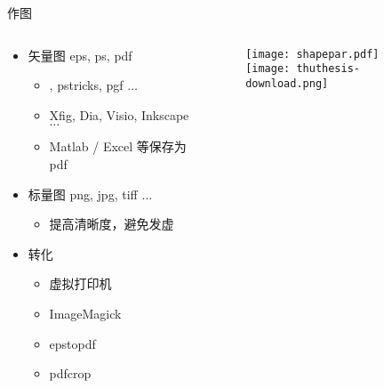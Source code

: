 \begin{frame}{作图}
  \begin{columns}[c]
    \begin{column}{.5\textwidth}
  \begin{itemize}
  \item 矢量图 eps, ps, pdf
    \begin{itemize}
    \item \MP, pstricks, pgf $\ldots$
    \item Xfig, Dia, \alert{Visio}, \alert{Inkscape} $\ldots$
    \item Matlab / Excel 等保存为 pdf
    \end{itemize}
  \item 标量图 png, jpg, tiff $\ldots$
    \begin{itemize}
      \item 提高清晰度，避免发虚
    \end{itemize}
  \item 转化
    \begin{itemize}
    \item 虚拟打印机
    \item ImageMagick
    \item epstopdf
    \item pdfcrop
    \end{itemize}
  \end{itemize}
    \end{column}
    \begin{column}{.4\textwidth}
\begin{figure}[h]
  \centering
\texttt{[image: shapepar.pdf]}\\\vspace{1cm}
\texttt{[image: thuthesis-download.png]}
\end{figure}
    \end{column}
  \end{columns}
\end{frame}

